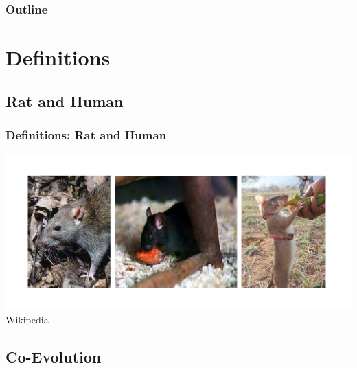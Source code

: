 \documentclass{beamer}
\begin{document}
\begin{frame}
  \frametitle{Outline}
  \tableofcontents[hideallsubsections]
\end{frame}

\section[Definitions]{Definitions}

\subsection[Rat and Human]{Rat and Human}

\begin{frame}
\frametitle{Definitions: Rat and Human}
\begin{center}
\includegraphics[width=1\textwidth,trim={0 .45in 0 .45in}]{RatVariations}
\linebreak
{\tiny Wikipedia}
\end{center}
\end{frame}

\subsection[Co-Evolution]{Co-Evolution}
\end{document}
